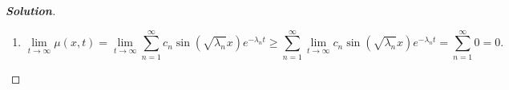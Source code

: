 \documentclass[letterpaper,11pt]{article} %
\theoremstyle{plain}
\begin{document}
\begin{proof}[\textbf{Solution}]
\begin{enumerate}[label=\alph*.)]
        The formal solution to the given heat problem can therefore be expressed as
        \begin{equation*}
        \mu(x, t) = \sum_{n=1}^\infty c_n \sin\left(\sqrt{\lambda_n}x\right) e^{-\lambda_n t}.
        \end{equation*}
        Since $\mu(x, 0) = f(x) = 75$,
        \begin{align*}
            \mu(x, 0) = \sum_{n=1}^\infty c_n \sin\left(\sqrt{\lambda_n}x\right) &= f(x) = 75
            \shortintertext{so}
            c_n = \frac{\displaystyle \int_0^1 f(x) X_n(x)\,\mathrm{d}x}{\displaystyle\int_0^1 X^2_n(x)\,\mathrm{d}x} &= \frac{\displaystyle 75\int_0^1  \sin(\sqrt{\lambda_n}x)\,\mathrm{d}x}{\displaystyle\int_0^1 \sin^2(\sqrt{\lambda_n}x)\,\mathrm{d}x} = \frac{\displaystyle \frac{75}{\sqrt{\lambda_n}}\left.\cos(\sqrt{\lambda_n}x)\right|_0^1}{\displaystyle \int_0^1 \left(\frac{1}{2} - \frac{1}{2} \cos(2\sqrt{\lambda_n}x)\right)\,\mathrm{d}x} \\
            &= \frac{\displaystyle \frac{75}{\sqrt{\lambda_n}}\left(\cos(\sqrt{\lambda_n} )- 1\right)}{\displaystyle \frac{1}{2} - \frac{1}{4\sqrt{\lambda_n}}\left.\sin(2\sqrt{\lambda_n}x)\right|_0^1 } = \frac{\displaystyle \frac{75}{\sqrt{\lambda_n}}\left(\cos(\sqrt{\lambda_n} )- 1\right)}{\displaystyle \frac{1}{2} - \frac{1}{4\sqrt{\lambda_n}}\sin(2\sqrt{\lambda_n})} \tag{$\ast$}
        \end{align*}
        The complete solution is therefore
        \begin{equation*}
         \boxed{\mu(x, t) = \sum_{n=1}^\infty \left(\frac{\displaystyle 75\left(\cos\left(\sqrt{\lambda_n} \right)- 1\right)}{\displaystyle \frac{\sqrt{\lambda_n}}{2} - \frac{1}{4}\sin\left(2\sqrt{\lambda_n}\right)} \right)\sin\left(\sqrt{\lambda_n}x\right) e^{-\lambda_n t}}.
        \end{equation*}
        where the eigenvalues $\lambda_n$ satisfy the transcendental equation $\tan(\sqrt{\lambda_n}) = -\sqrt{\lambda_n}$.
        
        \item \begin{equation*}
        \lim\limits_{t \to \infty} \mu(x, t) =  \lim\limits_{t \to \infty}\sum_{n=1}^\infty c_n \sin\left(\sqrt{\lambda_n}x\right) e^{-\lambda_n t} \geq \sum_{n=1}^\infty \lim\limits_{t \to \infty} c_n \sin\left(\sqrt{\lambda_n}x\right) e^{-\lambda_n t} = \sum_{n=1}^\infty 0 = \boxed{0}.
        \end{equation*}
        

\end{enumerate}
\end{proof}
\end{document}
